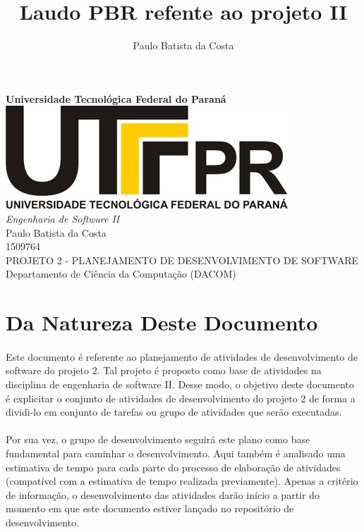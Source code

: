 \documentclass[12pt,a4paper]{article}
\author{Paulo Batista da Costa}
\title{Laudo PBR refente ao projeto II }
\begin{document}
	
        \begin{titlepage}
        \LARGE
        	\begin{center}
        	\vspace{5cm} 
        	\textbf{Universidade Tecnológica Federal do Paraná \\ \vspace{1.8cm}}
        	\includegraphics[scale=0.35]{logoutfpr.jpg} \\ \vspace{1.8cm}
        	\textit{Engenharia de Software II} \vspace{2cm} \\
        	Paulo Batista da Costa \\ 1509764 \vspace{2cm} \\ 
        	PROJETO 2 - PLANEJAMENTO DE DESENVOLVIMENTO DE SOFTWARE \vspace{2cm} \\
        	Departamento de Ciência da Computação (DACOM) 
        	
        	\end{center}
        \end{titlepage}	
	
		\tableofcontents
		
		
		\newpage
		\section{Da Natureza Deste Documento}
		\paragraph{} Este documento é referente ao planejamento de atividades de desenvolvimento de software do projeto 2. Tal projeto é proposto como base de atividades na disciplina de engenharia de software II. Desse modo, o objetivo deste documento é explicitar o conjunto de atividades de desenvolvimento do projeto 2 de forma a dividi-lo em conjunto de tarefas ou grupo de atividades que serão executadas. 
		
		\paragraph{} Por sua vez, o grupo de desenvolvimento seguirá este plano como base fundamental para caminhar o desenvolvimento. Aqui também é analisado uma estimativa de tempo para cada parte do processo de elaboração de atividades (compatível com a estimativa de tempo realizada previamente). Apenas a critério de informação, o desenvolvimento das atividades darão início  a partir do momento em que este documento estiver lançado no repositório de desenvolvimento.
\end{document}
